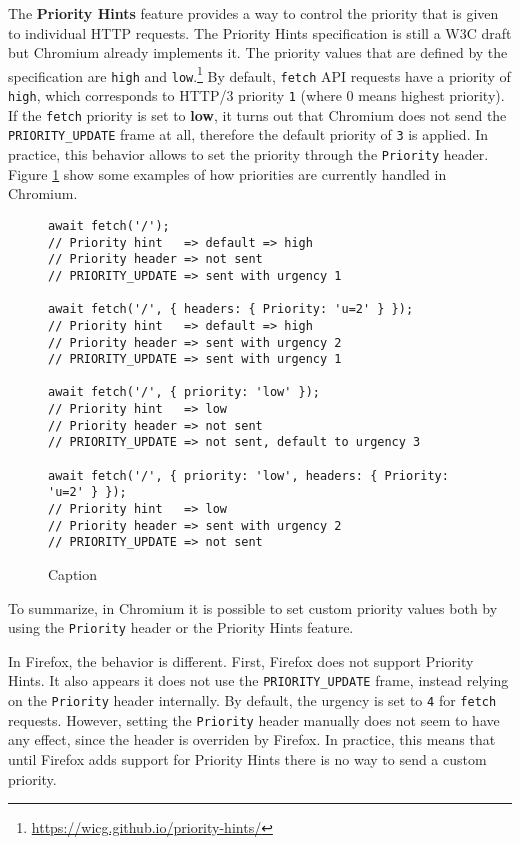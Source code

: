 The \textbf{Priority Hints} feature provides a way to control the priority that is given to individual HTTP requests. The Priority Hints specification is still a W3C draft but Chromium already implements it. The priority values that are defined by the specification are \texttt{high} and \texttt{low}.\footnote{\url{https://wicg.github.io/priority-hints/}} By default, \texttt{fetch} API requests have a priority of \texttt{high}, which corresponds to HTTP/3 priority \texttt{1} (where 0 means highest priority). If the \texttt{fetch} priority is set to \textbf{low}, it turns out that Chromium does not send the \texttt{PRIORITY\_UPDATE} frame at all, therefore the default priority of \texttt{3} is applied. In practice, this behavior allows to set the priority through the \texttt{Priority} header. Figure \ref{fig:chromium_fetch} show some examples of how priorities are currently handled in Chromium.

\begin{figure}
    \centering
    \begin{verbatim}
await fetch('/');
// Priority hint   => default => high
// Priority header => not sent
// PRIORITY_UPDATE => sent with urgency 1

await fetch('/', { headers: { Priority: 'u=2' } });
// Priority hint   => default => high
// Priority header => sent with urgency 2
// PRIORITY_UPDATE => sent with urgency 1

await fetch('/', { priority: 'low' });
// Priority hint   => low
// Priority header => not sent
// PRIORITY_UPDATE => not sent, default to urgency 3

await fetch('/', { priority: 'low', headers: { Priority: 'u=2' } });
// Priority hint   => low
// Priority header => sent with urgency 2
// PRIORITY_UPDATE => not sent
    \end{verbatim}
    \caption{Caption}
    \label{fig:chromium_fetch}
\end{figure}

To summarize, in Chromium it is possible to set custom priority values both by using the \texttt{Priority} header or the Priority Hints feature.

In Firefox, the behavior is different. First, Firefox does not support Priority Hints. It also appears it does not use the \texttt{PRIORITY\_UPDATE} frame, instead relying on the \texttt{Priority} header internally. By default, the urgency is set to \texttt{4} for \texttt{fetch} requests. However, setting the \texttt{Priority} header manually does not seem to have any effect, since the header is overriden by Firefox. In practice, this means that until Firefox adds support for Priority Hints there is no way to send a custom priority.

